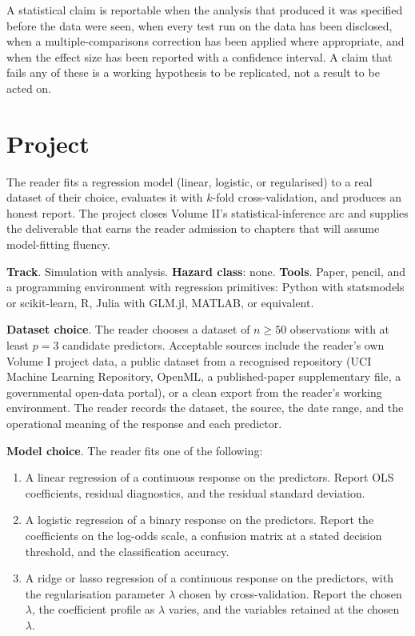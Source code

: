 \begin{principle}
A statistical claim is reportable when the analysis that produced
it was specified before the data were seen, when every test run on
the data has been disclosed, when a multiple-comparisons correction
has been applied where appropriate, and when the effect size has
been reported with a confidence interval. A claim that fails any
of these is a working hypothesis to be replicated, not a result to
be acted on.
\end{principle}

\section{Project}

\begin{project}
The reader fits a regression model (linear, logistic, or
regularised) to a real dataset of their choice, evaluates it with
$k$-fold cross-validation, and produces an honest report. The
project closes Volume II's statistical-inference arc and supplies
the deliverable that earns the reader admission to chapters that
will assume model-fitting fluency.

\textbf{Track}. Simulation with analysis. \textbf{Hazard class}: none.
\textbf{Tools}. Paper, pencil, and a programming environment with
regression primitives: Python with statsmodels or scikit-learn, R,
Julia with GLM.jl, MATLAB, or equivalent.

\textbf{Dataset choice}. The reader chooses a dataset of $n \geq
50$ observations with at least $p = 3$ candidate predictors.
Acceptable sources include the reader's own Volume I project data,
a public dataset from a recognised repository (UCI Machine Learning
Repository, OpenML, a published-paper supplementary file, a
governmental open-data portal), or a clean export from the reader's
working environment. The reader records the dataset, the source,
the date range, and the operational meaning of the response and
each predictor.

\textbf{Model choice}. The reader fits one of the following:
\begin{enumerate}[leftmargin=*]
  \item A linear regression of a continuous response on the
    predictors. Report OLS coefficients, residual diagnostics, and
    the residual standard deviation.
  \item A logistic regression of a binary response on the
    predictors. Report the coefficients on the log-odds scale, a
    confusion matrix at a stated decision threshold, and the
    classification accuracy.
  \item A ridge or lasso regression of a continuous response on
    the predictors, with the regularisation parameter $\lambda$
    chosen by cross-validation. Report the chosen $\lambda$, the
    coefficient profile as $\lambda$ varies, and the variables
    retained at the chosen $\lambda$.
\end{enumerate}


\end{project}
